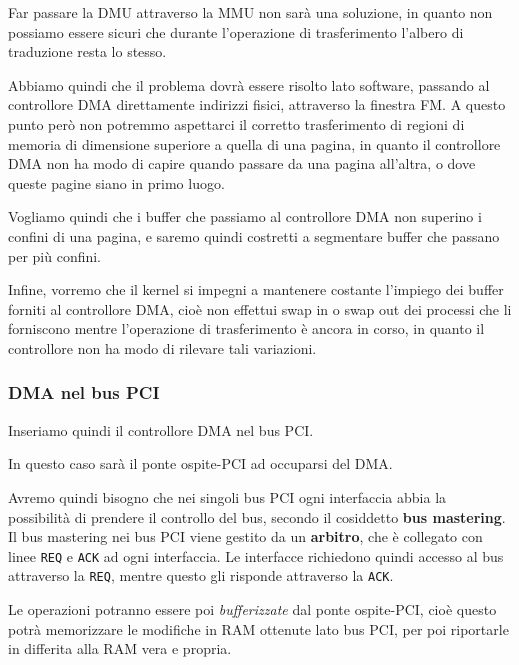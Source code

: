 \documentclass[a4paper,11pt]{article}
\begin{document}
Far passare la DMU attraverso la MMU non sarà una soluzione, in quanto non possiamo essere sicuri che durante l'operazione di trasferimento l'albero di traduzione resta lo stesso.

Abbiamo quindi che il problema dovrà essere risolto lato software, passando al controllore DMA direttamente indirizzi fisici, attraverso la finestra FM.
A questo punto però non potremmo aspettarci il corretto trasferimento di regioni di memoria di dimensione superiore a quella di una pagina, in quanto il controllore DMA non ha modo di capire quando passare da una pagina all'altra, o dove queste pagine siano in primo luogo.

Vogliamo quindi che i buffer che passiamo al controllore DMA non superino i confini di una pagina, e saremo quindi costretti a segmentare buffer che passano per più confini.

\par\smallskip

Infine, vorremo che il kernel si impegni a mantenere costante l'impiego dei buffer forniti al controllore DMA, cioè non effettui swap in o swap out dei processi che li forniscono mentre l'operazione di trasferimento è ancora in corso, in quanto il controllore non ha modo di rilevare tali variazioni.

\subsubsection{DMA nel bus PCI}
Inseriamo quindi il controllore DMA nel bus PCI.

In questo caso sarà il ponte ospite-PCI ad occuparsi del DMA.

Avremo quindi bisogno che nei singoli bus PCI ogni interfaccia abbia la possibilità di prendere il controllo del bus, secondo il cosiddetto \textbf{bus mastering}.
Il bus mastering nei bus PCI viene gestito da un \textbf{arbitro}, che è collegato con linee \lstinline|REQ| e \lstinline|ACK| ad ogni interfaccia.
Le interfacce richiedono quindi accesso al bus attraverso la \lstinline|REQ|, mentre questo gli risponde attraverso la \lstinline|ACK|.

Le operazioni potranno essere poi \textit{bufferizzate} dal ponte ospite-PCI, cioè questo potrà memorizzare le modifiche in RAM ottenute lato bus PCI, per poi riportarle in differita alla RAM vera e propria.
\end{document}

